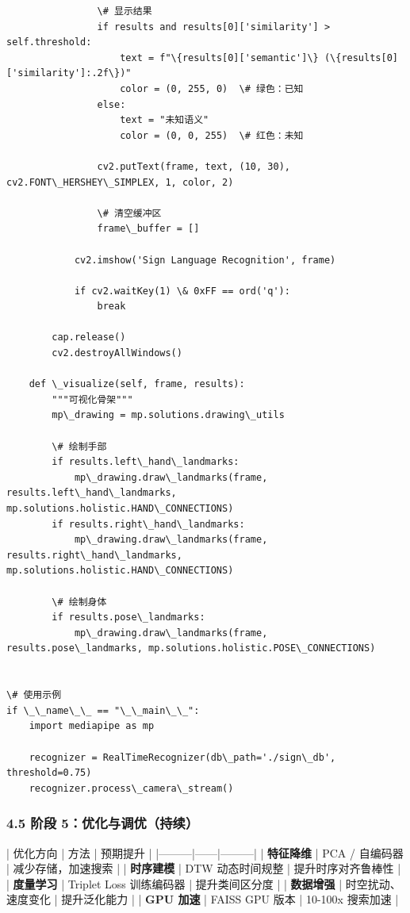 \documentclass[a4paper,12pt]{article}
\begin{document}
\begin{verbatim}
                \# 显示结果
                if results and results[0]['similarity'] > self.threshold:
                    text = f"\{results[0]['semantic']\} (\{results[0]['similarity']:.2f\})"
                    color = (0, 255, 0)  \# 绿色：已知
                else:
                    text = "未知语义"
                    color = (0, 0, 255)  \# 红色：未知
                
                cv2.putText(frame, text, (10, 30), cv2.FONT\_HERSHEY\_SIMPLEX, 1, color, 2)
                
                \# 清空缓冲区
                frame\_buffer = []
            
            cv2.imshow('Sign Language Recognition', frame)
            
            if cv2.waitKey(1) \& 0xFF == ord('q'):
                break
        
        cap.release()
        cv2.destroyAllWindows()
    
    def \_visualize(self, frame, results):
        """可视化骨架"""
        mp\_drawing = mp.solutions.drawing\_utils
        
        \# 绘制手部
        if results.left\_hand\_landmarks:
            mp\_drawing.draw\_landmarks(frame, results.left\_hand\_landmarks, mp.solutions.holistic.HAND\_CONNECTIONS)
        if results.right\_hand\_landmarks:
            mp\_drawing.draw\_landmarks(frame, results.right\_hand\_landmarks, mp.solutions.holistic.HAND\_CONNECTIONS)
        
        \# 绘制身体
        if results.pose\_landmarks:
            mp\_drawing.draw\_landmarks(frame, results.pose\_landmarks, mp.solutions.holistic.POSE\_CONNECTIONS)


\# 使用示例
if \_\_name\_\_ == "\_\_main\_\_":
    import mediapipe as mp
    
    recognizer = RealTimeRecognizer(db\_path='./sign\_db', threshold=0.75)
    recognizer.process\_camera\_stream()
\end{verbatim}


\subsubsection{4.5 阶段 5：优化与调优（持续）}

| 优化方向 | 方法 | 预期提升 |
|---------|------|---------|
| \textbf{特征降维} | PCA / 自编码器 | 减少存储，加速搜索 |
| \textbf{时序建模} | DTW 动态时间规整 | 提升时序对齐鲁棒性 |
| \textbf{度量学习} | Triplet Loss 训练编码器 | 提升类间区分度 |
| \textbf{数据增强} | 时空扰动、速度变化 | 提升泛化能力 |
| \textbf{GPU 加速} | FAISS GPU 版本 | 10-100x 搜索加速 |
\end{document}
